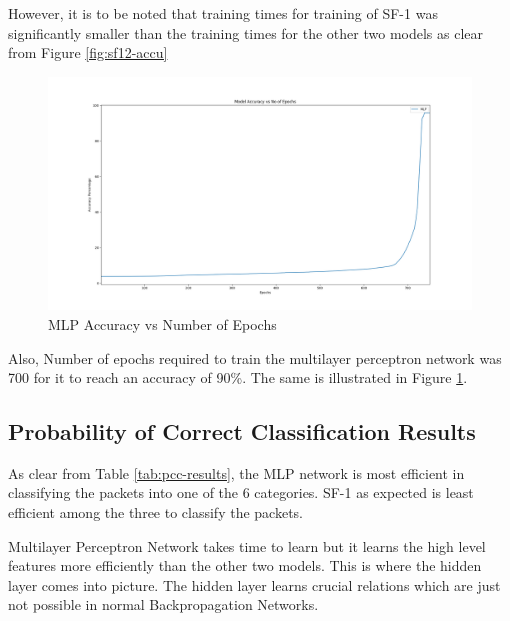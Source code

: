 \documentclass[12pt]{article}
\theoremstyle{definition}
\begin{document}
		However, it is to be noted that training times for training of SF-1 was significantly smaller than the training times for the other two models as clear from Figure \ref{fig:sf12-accu}
		\begin{figure}[!h]
			\centering
			\includegraphics[width=450pt]{pictures/mlp-accuracy.png}
			\caption{MLP Accuracy vs Number of Epochs}
			\label{fig:mlp-accu}
		\end{figure}
		Also, Number of epochs required to train the multilayer perceptron network was 700 for it to reach an accuracy of 90\%. The same is illustrated in Figure \ref{fig:mlp-accu}.
		
		
		\subsection{Probability of Correct Classification Results}
		As clear from Table \ref{tab:pcc-results}, the MLP network is most efficient in classifying the packets into one of the 6 categories. SF-1 as expected is least efficient among the three to classify the packets.
		
		Multilayer Perceptron Network takes time to learn but it learns the high level features more efficiently than the other two models. This is where the hidden layer comes into picture. The hidden layer learns crucial relations which are just not possible in normal Backpropagation Networks.
		
\end{document}
